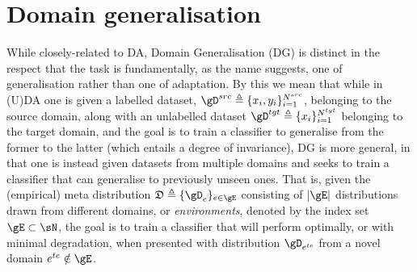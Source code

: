\section{Domain generalisation}\label{sec:domain_generalisation}
While closely-related to DA, Domain Generalisation (DG) is distinct in the respect that the task is
fundamentally, as the name suggests, one of \ood{} generalisation rather than one of adaptation.
%
By this we mean that while in (U)DA one is given a labelled dataset, \( \gD^{src} \triangleq
\{x_i, y_i \}_{i=1}^{N^{src}} \), belonging to the source domain, along with an unlabelled
dataset \( \gD^{tgt} \triangleq \{ x_i \}_{i=1}^{N^{tgt}} \) belonging to the target domain,
and the goal is to train a classifier to generalise from the former to the latter (which entails a
degree of invariance), DG is more general, in that one is instead given datasets from multiple
domains and seeks to train a classifier that can generalise to previously unseen ones. 
%
That is, given the (empirical) meta distribution \( \mathfrak{D} \triangleq \{\gD_e \}_{e \in \gE}
\) consisting of \( |\gE| \) distributions drawn from different domains, or \emph{environments},
denoted by the index set \( \gE \subset \sN \), the goal is to train a classifier that will perform
optimally, or with minimal degradation, when presented with distribution \( \gD_{e^{te}} \) from a
novel domain \( e^{te} \notin  \gE \).

